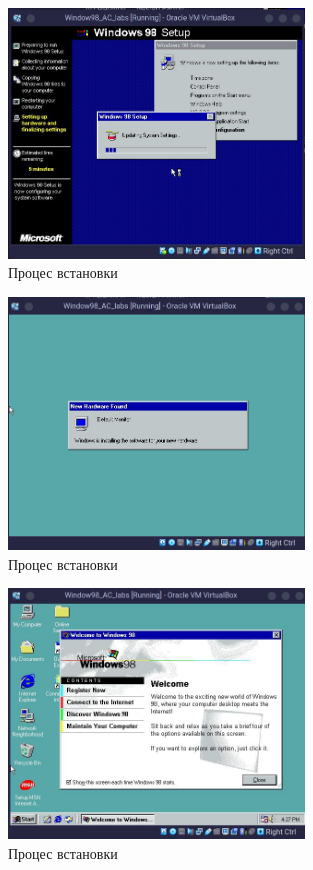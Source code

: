 \begin{figure}[h]
    \centering
    \includegraphics[width=0.7\textwidth]{reports/AC/lab1/assets/22.jpeg}
    \caption{Процес встановки}
\end{figure}

\begin{figure}[h]
    \centering
    \includegraphics[width=0.7\textwidth]{reports/AC/lab1/assets/23.jpeg}
    \caption{Процес встановки}
\end{figure}

\begin{figure}[h]
    \centering
    \includegraphics[width=0.7\textwidth]{reports/AC/lab1/assets/24.jpeg}
    \caption{Процес встановки}
\end{figure}


